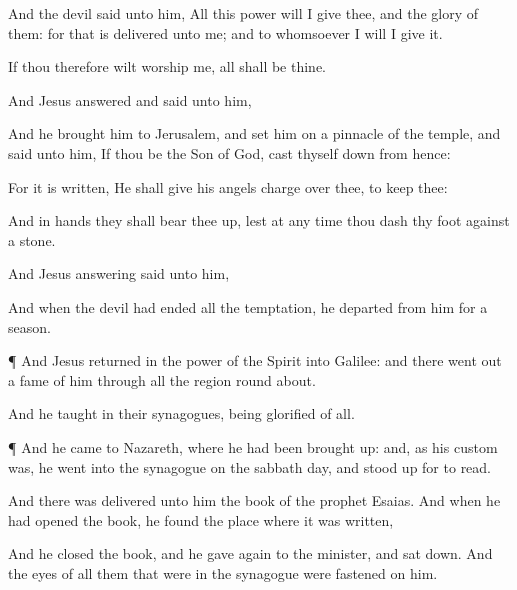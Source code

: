 {And the
devil
said unto
him,
All
this
power will I
give
thee,
and the
glory of
them: for
that is
delivered unto
me;
and to
whomsoever I
will I
give
it.

If
thou
therefore wilt
worship
me,
all shall
be
thine.

And
Jesus
answered and
said unto
him,
{}

And he
brought
him
to
Jerusalem,
and
set
him
on a
pinnacle of the
temple,
and
said unto
him,
If thou
be the
Son of
God,
cast
thyself
down from
hence:

For it is
written, He shall
give
his
angels
charge
over
thee, to
keep
thee:

And
in
{}
hands they shall
bear
thee
up, lest at any
time thou
dash
thy
foot
against a
stone.

And
Jesus
answering
said unto
him,
{}

And
when the
devil had
ended
all the
temptation, he
departed
from
him
for a
season.


\par }{\PP {}¶
And
Jesus
returned
in the
power of the
Spirit
into
Galilee:
and there went
out a
fame
of
him
through
all the region round
about.

And
he
taught
in
their
synagogues, being
glorified
of
all.


\par }{\PP {}¶
And he
came
to
Nazareth,
where he had
been brought
up:
and,
as
his custom
was, he
went
into the
synagogue
on the
sabbath
day,
and stood
up for to
read.

And there was
delivered unto
him the
book of the
prophet
Esaias.
And when he had
opened the
book, he
found the
place
where it
was
written,



And he
closed the
book, and he
gave
{}
again to the
minister, and sat
down.
And the
eyes of all
them that
were
in the
synagogue were
fastened on
him.

}
